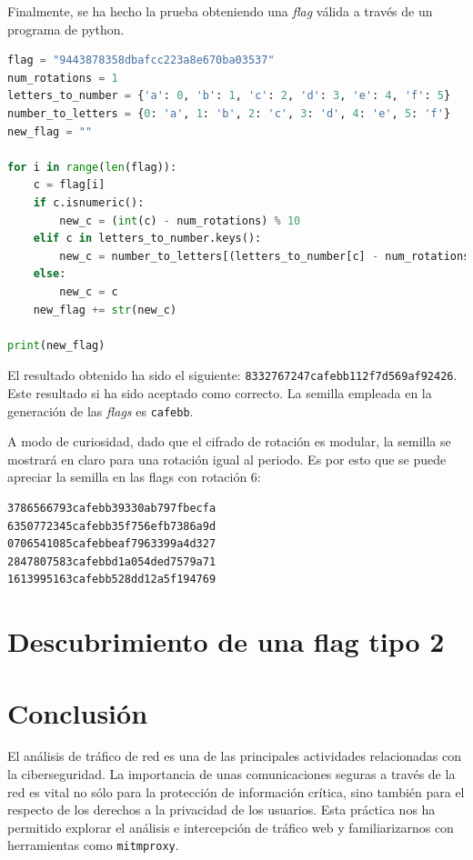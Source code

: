 \documentclass[]{article}
\begin{document}
Finalmente, se ha hecho la prueba obteniendo una \textit{flag} válida a través
de un programa de python.

\lstset{style=python}
\begin{lstlisting}[language=Python, caption=Decodificación de una flag de rotación 1]
flag = "9443878358dbafcc223a8e670ba03537"
num_rotations = 1
letters_to_number = {'a': 0, 'b': 1, 'c': 2, 'd': 3, 'e': 4, 'f': 5}
number_to_letters = {0: 'a', 1: 'b', 2: 'c', 3: 'd', 4: 'e', 5: 'f'}
new_flag = ""

for i in range(len(flag)):
    c = flag[i]
    if c.isnumeric():
        new_c = (int(c) - num_rotations) % 10
    elif c in letters_to_number.keys():
        new_c = number_to_letters[(letters_to_number[c] - num_rotations) % 6]
    else:
        new_c = c
    new_flag += str(new_c)

print(new_flag)

\end{lstlisting}

El resultado obtenido ha sido el siguiente:
\texttt{8332767247cafebb112f7d569af92426}. Este resultado si ha sido aceptado
como correcto. La semilla empleada en la generación de las \textit{flags} es
\texttt{cafebb}.

A modo de curiosidad, dado que el cifrado de rotación es modular, la semilla se
mostrará en claro para una rotación igual al periodo. Es por esto que se puede
apreciar la semilla en las flags con rotación 6:

\begin{lstlisting}[language=flag, caption=Flags para rotacion 6]
3786566793cafebb39330ab797fbecfa
6350772345cafebb35f756efb7386a9d
0706541085cafebbeaf7963399a4d327
2847807583cafebbd1a054ded7579a71
1613995163cafebb528dd12a5f194769
\end{lstlisting}

\section{Descubrimiento de una flag tipo 2}
\label{sec:tipo2}

\section{Conclusión}
\label{sec:conclusion}
El análisis de tráfico de red es una de las principales actividades relacionadas con la ciberseguridad. La importancia de unas comunicaciones seguras a través de la red es vital no sólo para la protección de información crítica, sino también para el respecto de los derechos a la privacidad de los usuarios. Esta práctica nos ha permitido explorar el análisis e intercepción de tráfico web y familiarizarnos con herramientas como \texttt{mitmproxy}.
\end{document}

